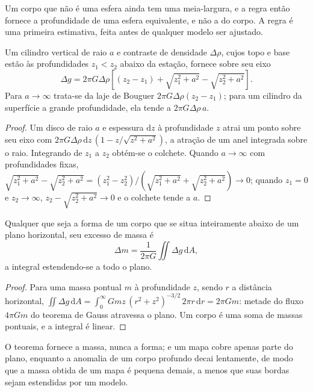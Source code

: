 Um corpo que não é uma esfera ainda tem uma meia-largura, e a regra então
fornece a profundidade de uma esfera equivalente, e não a do corpo. A regra é
uma primeira estimativa, feita antes de qualquer modelo ser ajustado.

\begin{proposition}\label{prop:b3:field-lab-methods-3:vcyl}
Um cilindro vertical de raio $a$ e contraste de densidade $\Delta\rho$,
cujos topo e base estão às profundidades $z_1 < z_2$ abaixo da estação,
fornece sobre seu eixo
\[
\Delta g = 2\pi G\Delta\rho\left[(z_2 - z_1) + \sqrt{z_1^2 + a^2}
           - \sqrt{z_2^2 + a^2}\right] .
\]
Para $a \to \infty$ trata-se da laje de Bouguer $2\pi G\Delta\rho(z_2 - z_1)$;
para um cilindro da superfície a grande profundidade, ela tende a
$2\pi G\Delta\rho\,a$.
\end{proposition}

\begin{proof}
Um disco de raio $a$ e espessura $\mathrm{d}z$ à profundidade $z$ atrai
um ponto sobre seu eixo com $2\pi G\Delta\rho\,\mathrm{d}z\,(1 -
z/\sqrt{z^2 + a^2})$, a atração de um anel integrada sobre o
raio. Integrando de $z_1$ a $z_2$ obtém-se o colchete. Quando $a \to
\infty$ com profundidades fixas, $\sqrt{z_1^2 + a^2} - \sqrt{z_2^2 + a^2} =
(z_1^2 - z_2^2)/(\sqrt{z_1^2 + a^2} + \sqrt{z_2^2 + a^2}) \to 0$; quando
$z_1 = 0$ e $z_2 \to \infty$, $z_2 - \sqrt{z_2^2 + a^2} \to 0$ e
o colchete tende a $a$.
\end{proof}

\begin{proposition}\label{prop:b3:field-lab-methods-3:gauss}
Qualquer que seja a forma de um corpo que se situa inteiramente abaixo de um
plano horizontal, seu excesso de massa é
\[
\Delta m = \frac{1}{2\pi G}\iint \Delta g\,\mathrm{d}A ,
\]
a integral estendendo-se a todo o plano.
\end{proposition}

\begin{proof}
Para uma massa pontual $m$ à profundidade $z$, sendo $r$ a distância horizontal,
$\iint \Delta g\,\mathrm{d}A = \int_0^\infty
Gmz\,(r^2 + z^2)^{-3/2}\,2\pi r\,\mathrm{d}r = 2\pi Gm$: metade do fluxo
$4\pi Gm$ do teorema de Gauss atravessa o plano. Um corpo é uma soma de
massas pontuais, e a integral é linear.
\end{proof}

O teorema fornece a massa, nunca a forma; e um mapa cobre apenas parte
do plano, enquanto a anomalia de um corpo profundo decai lentamente, de modo que a
massa obtida de um mapa é pequena demais, a menos que suas bordas sejam estendidas por
um modelo.

